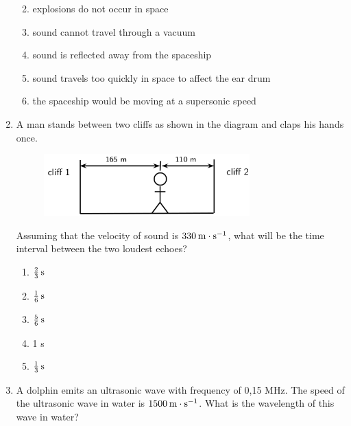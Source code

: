 \begin{enumerate}[noitemsep, label=\textbf{\arabic*}. ]
\begin{enumerate}[noitemsep, label=\textbf{\alph*}. ]
            \label{m38800*uid48}\item explosions do not occur in space
\label{m38800*uid49}\item sound cannot travel through a vacuum
\label{m38800*uid50}\item sound is reflected away from the spaceship
\label{m38800*uid51}\item sound travels too quickly in space to affect the ear drum
\label{m38800*uid52}\item the spaceship would be moving at a supersonic speed
\end{enumerate}
                \label{m38800*uid53}\item A man stands between two cliffs as shown in the diagram and claps his hands once.
    \setcounter{subfigure}{0}
	\begin{figure}[H] %
    \begin{center}
    \label{m38800*id186481!!!underscore!!!media}\label{m38800*id186481!!!underscore!!!printimage}\includegraphics[width=300px]{col11305.imgs/m38800_PG11C5_006.png} %
      \vspace{2pt}
    \vspace{.1in}
    \end{center}
 \end{figure}       
Assuming that the velocity of sound is $330\phantom{\rule{2pt}{0ex}}\mathrm{m}\ensuremath{\cdot}\mathrm{s}{}^{-1}$, what will be the time interval between the two loudest echoes?
\label{m38800*id186509}\begin{enumerate}[noitemsep, label=\textbf{\alph*}. ] 
            \label{m38800*uid54}\item $\frac{2}{3}\phantom{\rule{2pt}{0ex}}\mathrm{s}$
\label{m38800*uid55}\item $\frac{1}{6}\phantom{\rule{2pt}{0ex}}\mathrm{s}$
\label{m38800*uid56}\item $\frac{5}{6}\phantom{\rule{2pt}{0ex}}\mathrm{s}$
\label{m38800*uid57}\item 1 s
\label{m38800*uid58}\item $\frac{1}{3}\phantom{\rule{2pt}{0ex}}\mathrm{s}$
\end{enumerate}
                \label{m38800*uid59}\item A dolphin emits an ultrasonic wave with frequency of 0,15 MHz. The speed of the ultrasonic wave in water is $1 500\phantom{\rule{2pt}{0ex}}\mathrm{m}\ensuremath{\cdot}\mathrm{s}{}^{-1}$. What is the wavelength of this wave in water?

\end{enumerate}
